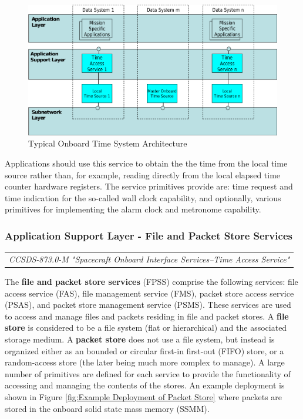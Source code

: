 \begin{figure}[h]
\centering\includegraphics[scale=0.3]{fig/typical_onboard_time_system_architecture}
\caption{Typical Onboard Time System Architecture}
\label{fig:Typical Onboard Time System Architecture}
\end{figure}

Applications should use this service to obtain the the time from the local time source rather than, for example, reading directly from the local elapsed time counter hardware registers. The service primitives provide are: time request and time indication for the so-called wall clock capability, and optionally, various primitives for implementing the alarm clock and metronome capability. 

\subsubsection{Application Support Layer - File and Packet Store Services}

\begin{tabular}{l}
\textit{CCSDS-873.0-M "Spacecraft Onboard Interface Services--Time Access Service" \cite{}} 
\end{tabular}

The \textbf{file and packet store services} (FPSS) comprise the following services: file access service (FAS), file management service (FMS), packet store access service (PSAS), and packet store management service (PSMS). These services are used to access and manage files and packets residing in file and packet stores. A \textbf{file store} is considered to be a file system (flat or hierarchical) and the associated storage medium. A \textbf{packet store} does not use a file system, but instead is organized either as an bounded or circular first-in first-out (FIFO) store, or a random-access store (the later being much more complex to manage). A large number of primitives are defined for each service to provide the functionality of accessing and managing the contents of the stores. An example deployment is shown in Figure \ref{fig:Example Deployment of Packet Store} where packets are stored in the onboard solid state mass memory (SSMM).

